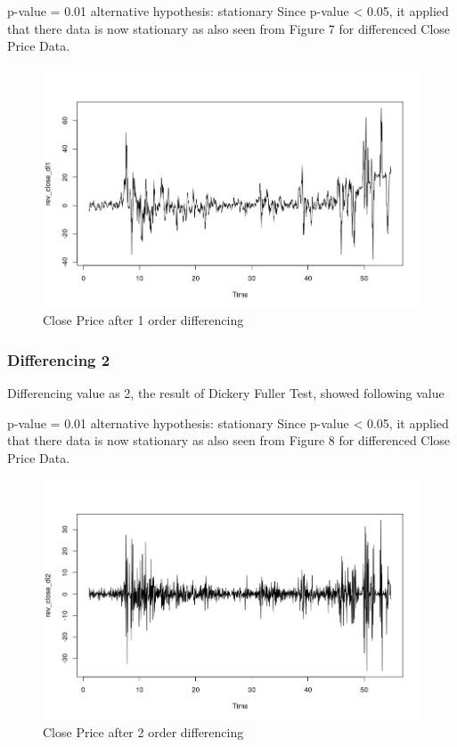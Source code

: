 \documentclass{article}
\begin{document}
p-value = 0.01 \linebreak
alternative hypothesis: stationary \linebreak
Since p-value < 0.05, it applied that there data is now stationary as also seen from Figure 7 for differenced Close Price Data.

\begin{figure}[ht]
	\centering
	\includegraphics[scale=0.25]{images/ts_images/CloseWithDifferencing1.png}
	\caption{Close Price after 1 order differencing}
	\label{fig:Close Price after 1 order differencing}
\end{figure}

\subsubsection{Differencing 2}
Differencing value as 2, the result of Dickery Fuller Test, showed following value

p-value = 0.01 \linebreak
alternative hypothesis: stationary \linebreak
Since p-value < 0.05, it applied that there data is now stationary as also seen from Figure 8 for differenced Close Price Data.

\begin{figure}[ht]
	\centering
	\includegraphics[scale=0.25]{images/ts_images/CloseWithDifferencing2.png}
	\caption{Close Price after 2 order differencing}
	\label{fig:Close Price after 2 order differencing}
\end{figure}
\end{document}
